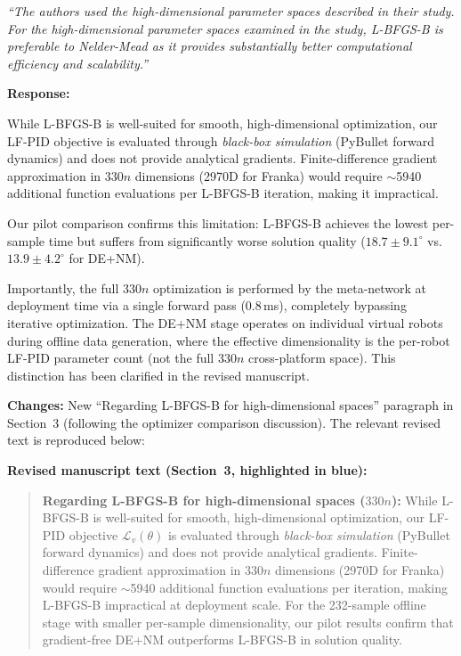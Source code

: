 \documentclass[11pt,a4paper]{article}
\newcommand{\reviewercomment}[1]{\medskip\noindent\textit{``#1''}\medskip}
\newcommand{\response}{\noindent\textbf{Response:}\par\noindent}
\begin{document}
\reviewercomment{The authors used the high-dimensional parameter spaces described in their study. For the high-dimensional parameter spaces examined in the study, L-BFGS-B is preferable to Nelder-Mead as it provides substantially better computational efficiency and scalability.}

\response
While L-BFGS-B is well-suited for smooth, high-dimensional optimization, our LF-PID objective is evaluated through \emph{black-box simulation} (PyBullet forward dynamics) and does not provide analytical gradients. Finite-difference gradient approximation in $330n$ dimensions (2970D for Franka) would require $\sim$5940 additional function evaluations per L-BFGS-B iteration, making it impractical.

Our pilot comparison confirms this limitation: L-BFGS-B achieves the lowest per-sample time but suffers from significantly worse solution quality ($18.7 \pm 9.1^\circ$ vs.\ $13.9 \pm 4.2^\circ$ for DE+NM).

Importantly, the full $330n$ optimization is performed by the meta-network at deployment time via a single forward pass (0.8\,ms), completely bypassing iterative optimization. The DE+NM stage operates on individual virtual robots during offline data generation, where the effective dimensionality is the per-robot LF-PID parameter count (not the full $330n$ cross-platform space). This distinction has been clarified in the revised manuscript.

\textbf{Changes:} New ``Regarding L-BFGS-B for high-dimensional spaces'' paragraph in Section~3 (following the optimizer comparison discussion). The relevant revised text is reproduced below:

\textbf{Revised manuscript text (Section~3, highlighted in blue):}

\begin{quote}\color{blue}\small
\textbf{Regarding L-BFGS-B for high-dimensional spaces ($330n$):} While L-BFGS-B is well-suited for smooth, high-dimensional optimization, our LF-PID objective $\mathcal{L}_v(\theta)$ is evaluated through \textit{black-box simulation} (PyBullet forward dynamics) and does not provide analytical gradients. Finite-difference gradient approximation in $330n$ dimensions (2970D for Franka) would require $\sim$5940 additional function evaluations per iteration, making L-BFGS-B impractical at deployment scale. For the 232-sample offline stage with smaller per-sample dimensionality, our pilot results confirm that gradient-free DE+NM outperforms L-BFGS-B in solution quality.
\end{quote}
\end{document}
